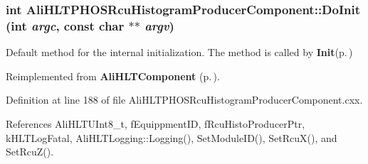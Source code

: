 \subsubsection{\setlength{\rightskip}{0pt plus 5cm}int Ali\-HLTPHOSRcu\-Histogram\-Producer\-Component::Do\-Init (int {\em argc}, const char $\ast$$\ast$ {\em argv})\hspace{0.3cm}{\tt  [virtual]}}\label{classAliHLTPHOSRcuHistogramProducerComponent_a2}


Default method for the internal initialization. The method is called by {\bf Init}{\rm (p.\,\pageref{classAliHLTProcessor_a2})} 

Reimplemented from {\bf Ali\-HLTComponent} {\rm (p.\,\pageref{classAliHLTComponent_b5})}.

Definition at line 188 of file Ali\-HLTPHOSRcu\-Histogram\-Producer\-Component.cxx.

References Ali\-HLTUInt8\_\-t, f\-Equippment\-ID, f\-Rcu\-Histo\-Producer\-Ptr, k\-HLTLog\-Fatal, Ali\-HLTLogging::Logging(), Set\-Module\-ID(), Set\-Rcu\-X(), and Set\-Rcu\-Z().

